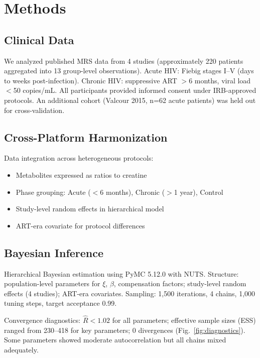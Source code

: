 \documentclass[10pt,a4paper]{article}
\begin{document}
\section{Methods}

\subsection{Clinical Data}

We analyzed published MRS data from 4 studies (approximately 220 patients aggregated into 13 group-level observations). Acute HIV: Fiebig stages I--V (days to weeks post-infection). Chronic HIV: suppressive ART $>$6 months, viral load $<$50 copies/mL. All participants provided informed consent under IRB-approved protocols\cite{sailasuta2012,young2014,valcour2012}. An additional cohort (Valcour 2015, n=62 acute patients) was held out for cross-validation.

\subsection{Cross-Platform Harmonization}

Data integration across heterogeneous protocols:
\begin{itemize}
\item Metabolites expressed as ratios to creatine
\item Phase grouping: Acute ($<$6 months), Chronic ($>$1 year), Control
\item Study-level random effects in hierarchical model
\item ART-era covariate for protocol differences
\end{itemize}

\subsection{Bayesian Inference}

Hierarchical Bayesian estimation using PyMC 5.12.0\cite{abril2023} with NUTS\cite{hoffman2014}. Structure: population-level parameters for $\xi$, $\beta$, compensation factors; study-level random effects (4 studies); ART-era covariates. Sampling: 1,500 iterations, 4 chains, 1,000 tuning steps, target acceptance 0.99.

Convergence diagnostics: $\hat{R} < 1.02$ for all parameters; effective sample sizes (ESS) ranged from 230--418 for key parameters; 0 divergences (Fig.~\ref{fig:diagnostics}). Some parameters showed moderate autocorrelation but all chains mixed adequately.
\end{document}
